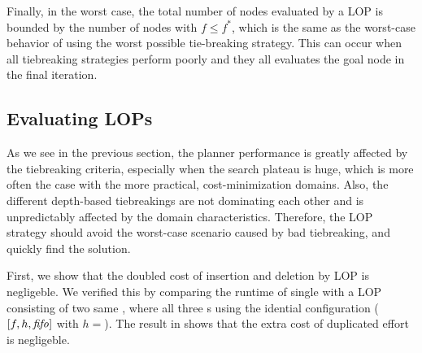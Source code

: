 
Finally, in the worst case, the total number of nodes evaluated by a LOP is bounded by the number of nodes with $f \leq f^*$, which is the same as the worst-case behavior of \astar using the worst possible tie-breaking strategy.
This can occur  when all tiebreaking
strategies perform poorly  and they all evaluates the goal node in the
final iteration.

\subsection{Evaluating LOPs}

As we see in the previous section, the planner performance is greatly
affected by the tiebreaking criteria, especially when the search plateau
is huge, which is more often the case with the more practical,
cost-minimization domains.
% 
Also, the different depth-based tiebreakings are not dominating
each other and is unpredictably affected by the domain characteristics.
% 
Therefore, the LOP strategy should avoid the
worst-case scenario caused by bad tiebreaking, and quickly find the solution.

First, we show that the doubled cost of insertion and deletion by LOP is
negligeble.  We verified this by comparing the runtime of single \astar
with a LOP consisting of two same \astar, where all three \astar{}s
using the idential configuration ($[f,h,\mbox{\textit{fifo}}]$ with $h=$\lmcut). The
result in  shows that the extra cost of duplicated effort
is negligeble.

